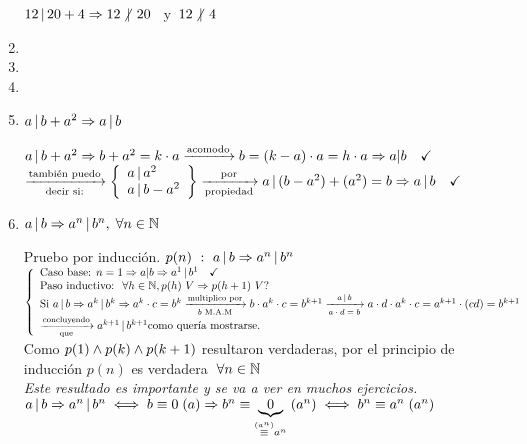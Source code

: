 \begin{enumerate}[label=\roman*)]
	      $12 \divideA 20 + 4 \entonces 12 \noDivide 20$  \ y\   $ 12\noDivide 4 $

	\item
	      \separadorCorto
	      \hacer
	\item
	      \separadorCorto
	      \hacer
	\item
	      \separadorCorto
	      \hacer
	\item $a \, | \, b + a^2 \Rightarrow a \, | \, b$\\
	      \separadorCorto

	      $  a \divideA b + a^2 \entonces b + a^2 = k \cdot a \flecha{acomodo} b = (k - a) \cdot a = h \cdot a \entonces a | b \Tilde$\\
	      $ \flecha{también puedo}[decir si:]
		      \llaves{l}{
			      a \divideA a^2 \\
			      a \divideA b - a^2
		      } \flecha{por}[propiedad] a \divideA (b - a^2) + (a^2) = b \entonces a \divideA b \Tilde $


	\item $a \, | \, b \Rightarrow a^n \, | \, b^n, \;\forall n \in \mathbb N$\\
	      \separadorCorto

	      Pruebo por inducción. $p(n)\  :\  a \, | \, b \Rightarrow a^n \, | \, b^n $\\
	      $
		      \llave{l}{
			      \text{Caso base: } n = 1 \entonces a|b \entonces a^1 \divideA b^1 \Tilde\\
			      \text{Paso inductivo: } \paratodo h \en \naturales, p(h) \ V \entonces p(h+1)\ V?\\
			      \text{Si } a \divideA b \entonces a^k \divideA b^k  \entonces a^k \cdot c = b^k
			      \flecha{multiplico por}[$b$ M.A.M]
			      b \cdot a^k \cdot c = b^{k+1}
			      \flecha{$a\divideA b$}[$a \cdot d = b$]
			      a\cdot d \cdot a^k \cdot c =  a^{k+1}\cdot(cd) = b^{k+1}\\
			      \flecha{concluyendo}[que] a^{k+1} \divideA b^{k+1} \text{como quería mostrarse.}
		      }
	      $ Como $p(1) \land p(k) \land p(k+1)$ resultaron verdaderas, por el principio de inducción $p(n)$
	      es verdadera $\;\forall n \in \mathbb N$\\
	      \textit{Este resultado es importante y se va a ver en muchos ejercicios.\\
		      $a \, | \, b \Rightarrow a^n \, | \, b^n \iff
			      b \equiv 0 \;(a) \Rightarrow b^n \equiv \underbrace{\textstyle 0}_{\stackrel{(a^n)}{\, \equiv \,} a^n} \;(a^n) \iff b^n \equiv a^n \;(a^n)$}


\end{enumerate}

